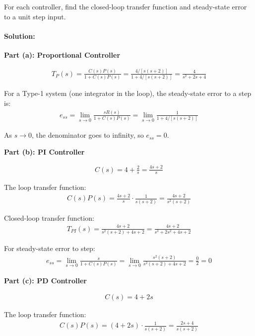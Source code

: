 \documentclass[11pt,a4paper]{article}
\begin{document}
For each controller, find the closed-loop transfer function and steady-state error to a unit step input.

\paragraph{Solution:}

\textbf{Part (a): Proportional Controller}

\begin{align}
T_P(s) = \frac{C(s)P(s)}{1 + C(s)P(s)} = \frac{4/[s(s+2)]}{1 + 4/[s(s+2)]} = \frac{4}{s^2 + 2s + 4}
\end{align}

For a Type-1 system (one integrator in the loop), the steady-state error to a step is:
\begin{align}
e_{ss} = \lim_{s \to 0} \frac{sR(s)}{1 + C(s)P(s)} = \lim_{s \to 0} \frac{1}{1 + 4/[s(s+2)]}
\end{align}

As $s \to 0$, the denominator goes to infinity, so $e_{ss} = 0$.

\textbf{Part (b): PI Controller}

\begin{align}
C(s) = 4 + \frac{2}{s} = \frac{4s + 2}{s}
\end{align}

The loop transfer function:
\begin{align}
C(s)P(s) = \frac{4s+2}{s} \cdot \frac{1}{s(s+2)} = \frac{4s+2}{s^2(s+2)}
\end{align}

Closed-loop transfer function:
\begin{align}
T_{PI}(s) = \frac{4s+2}{s^2(s+2) + 4s + 2} = \frac{4s+2}{s^3 + 2s^2 + 4s + 2}
\end{align}

For steady-state error to step:
\begin{align}
e_{ss} = \lim_{s \to 0} \frac{s}{1 + C(s)P(s)} = \lim_{s \to 0} \frac{s^2(s+2)}{s^2(s+2) + 4s + 2} = \frac{0}{2} = 0
\end{align}

\textbf{Part (c): PD Controller}

\begin{align}
C(s) = 4 + 2s
\end{align}

The loop transfer function:
\begin{align}
C(s)P(s) = (4 + 2s) \cdot \frac{1}{s(s+2)} = \frac{2s+4}{s(s+2)}
\end{align}
\end{document}
